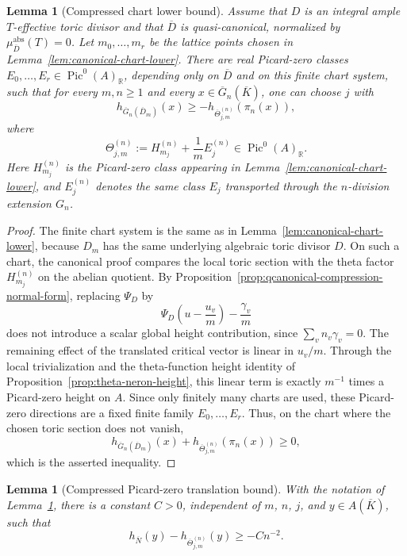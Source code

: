 \documentclass[10pt,a4paper]{amsart}
\theoremstyle{plain}
\newtheorem{lemma}[theorem]{Lemma}
\theoremstyle{plain}
\numberwithin{equation}{section}
\providecommand{\bR}{\mathbb{R}}
\providecommand{\ol}{\overline}
\providecommand{\muabs}{\mu^{\mathrm{abs}}}
\begin{document}
\begin{lemma}[Compressed chart lower bound]
	\label{lem:compressed-chart-lower}
	Assume that \(D\) is an integral ample \(T\)-effective toric divisor and that
	\(\ol D\) is quasi-canonical, normalized by
	\(\muabs_{\ol D}(T)=0\).  Let \(m_0,\ldots,m_r\) be the lattice points chosen in
	Lemma~\ref{lem:canonical-chart-lower}.  There are real Picard-zero classes
	\(E_0,\ldots,E_r\in \operatorname{Pic}^0(A)_\bR\), depending only on \(\ol D\) and on this
	finite chart system, such that for every \(m,n\ge1\) and every
	\(x\in\overline G_n(\overline K)\), one can choose \(j\) with
	\[
	h_{\overline G_n(\ol D_m)}(x)
	\ge
	-h_{\overline\Theta_{j,m}^{(n)}}(\pi_n(x)),
	\]
	where
	\[
	\Theta_{j,m}^{(n)}
	:=
	H_{m_j}^{(n)}+\frac1mE_j^{(n)}\in\operatorname{Pic}^0(A)_\bR.
	\]
	Here \(H_{m_j}^{(n)}\) is the Picard-zero class appearing in
	Lemma~\ref{lem:canonical-chart-lower}, and \(E_j^{(n)}\) denotes the same class
	\(E_j\) transported through the \(n\)-division extension \(G_n\).
\end{lemma}

\begin{proof}
	The finite chart system is the same as in
	Lemma~\ref{lem:canonical-chart-lower}, because \(D_m\) has the same underlying
	algebraic toric divisor \(D\).  On such a chart, the canonical proof compares
	the local toric section with the theta factor \(H_{m_j}^{(n)}\) on the abelian
	quotient.  By Proposition~\ref{prop:qcanonical-compression-normal-form}, replacing
	\(\Psi_D\) by
	\[
	\Psi_D\left(u-\frac{u_v}{m}\right)-\frac{\gamma_v}{m}
	\]
	does not introduce a scalar global height contribution, since
	\(\sum_vn_v\gamma_v=0\).  The remaining effect of the translated critical
	vector is linear in \(u_v/m\).  Through the local trivialization and the
	theta-function height identity of Proposition~\ref{prop:theta-neron-height},
	this linear term is exactly \(m^{-1}\) times a Picard-zero height on \(A\).
	Since only finitely many charts are used, these Picard-zero directions are a
	fixed finite family \(E_0,\ldots,E_r\).  Thus, on the chart where the chosen
	toric section does not vanish,
	\[
	h_{\overline G_n(\ol D_m)}(x)
	+h_{\overline\Theta_{j,m}^{(n)}}(\pi_n(x))\ge0,
	\]
	which is the asserted inequality.
\end{proof}

\begin{lemma}[Compressed Picard-zero translation bound]
	\label{lem:compressed-picard-bound}
	With the notation of Lemma~\ref{lem:compressed-chart-lower}, there is a
	constant \(C>0\), independent of \(m\), \(n\), \(j\), and
	\(y\in A(\overline K)\), such that
	\[
	h_{\overline N}(y)-h_{\overline\Theta_{j,m}^{(n)}}(y)\ge -Cn^{-2}.
	\]
\end{lemma}
\end{document}
